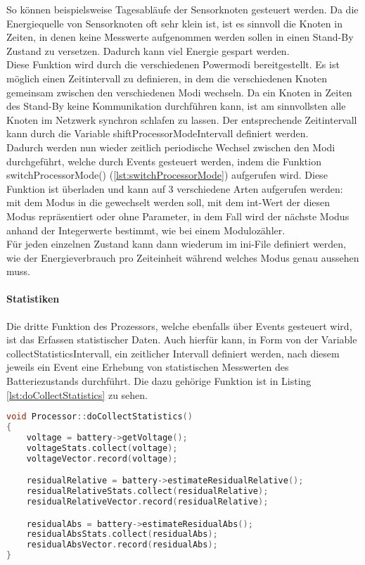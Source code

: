 So können beispielsweise Tagesabläufe der Sensorknoten gesteuert werden. Da die Energiequelle von Sensorknoten oft sehr klein ist, ist es sinnvoll die Knoten in Zeiten, in denen keine Messwerte aufgenommen werden sollen in einen Stand-By Zustand zu versetzen. Dadurch kann viel Energie gespart werden.\\
Diese Funktion wird durch die verschiedenen Powermodi bereitgestellt. Es ist möglich einen Zeitintervall zu definieren, in dem die verschiedenen Knoten gemeinsam zwischen den verschiedenen Modi wechseln. Da ein Knoten in Zeiten des Stand-By keine Kommunikation durchführen kann, ist am sinnvollsten alle Knoten im Netzwerk synchron schlafen zu lassen. Der entsprechende Zeitintervall kann durch die Variable shiftProcessorModeIntervall definiert werden.\\
Dadurch werden nun wieder zeitlich periodische Wechsel zwischen den Modi durchgeführt, welche durch Events gesteuert werden, indem die Funktion switchProcessorMode() (\ref{lst:switchProcessorMode}) aufgerufen wird. Diese Funktion ist überladen und kann auf 3 verschiedene Arten aufgerufen werden: mit dem Modus in die gewechselt werden soll, mit dem int-Wert der diesen Modus repräsentiert oder ohne Parameter, in dem Fall wird der nächste Modus anhand der Integerwerte bestimmt, wie bei einem Modulozähler.\\
Für jeden einzelnen Zustand kann dann wiederum im ini-File definiert werden, wie der Energieverbrauch pro Zeiteinheit während welches Modus genau aussehen muss.

\paragraph{Statistiken}

Die dritte Funktion des Prozessors, welche ebenfalls über Events gesteuert wird, ist das Erfassen statistischer Daten. Auch hierfür kann, in Form von der Variable collectStatisticsIntervall, ein zeitlicher Intervall definiert werden, nach diesem jeweils ein Event eine Erhebung von statistischen Messwerten des Batteriezustands durchführt. Die dazu gehörige Funktion ist in Listing \ref{lst:doCollectStatistics} zu sehen.

\begin{lstlisting}[language=C++, label=lst:doCollectStatistics, caption=doCollectStatistics()]
void Processor::doCollectStatistics()
{
    voltage = battery->getVoltage();
    voltageStats.collect(voltage);
    voltageVector.record(voltage);

    residualRelative = battery->estimateResidualRelative();
    residualRelativeStats.collect(residualRelative);
    residualRelativeVector.record(residualRelative);

    residualAbs = battery->estimateResidualAbs();
    residualAbsStats.collect(residualAbs);
    residualAbsVector.record(residualAbs);
}
\end{lstlisting}
